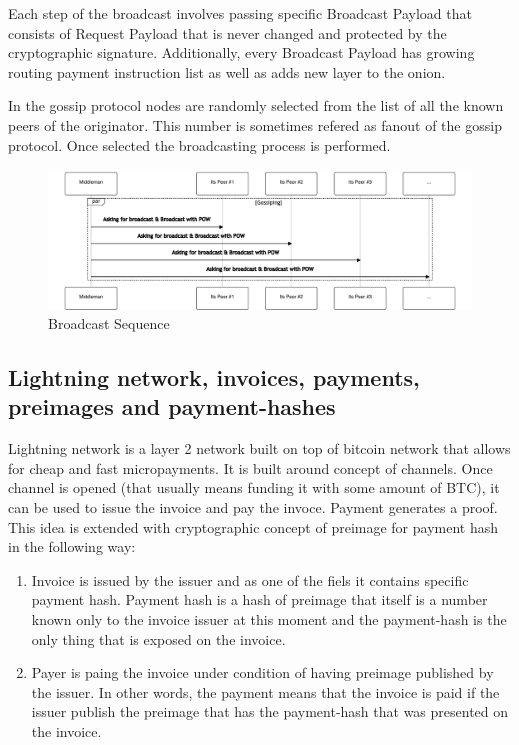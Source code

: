 \documentclass{article}
\begin{document}
Each step of the broadcast involves passing specific Broadcast Payload that consists of Request Payload that is never changed and protected by the cryptographic signature.  Additionally, every Broadcast Payload has growing routing payment instruction list as well as adds new layer to the onion.

In the gossip protocol nodes are randomly selected from the list of all the known peers of the originator. This number is sometimes refered as fanout \cite{Fanout} of the gossip protocol. Once selected the broadcasting process is performed.

\begin{figure}
	\centering
	\includegraphics[scale=0.5]{BroadcastSequence.pdf}
	\caption{Broadcast Sequence}
	\label{fig:fr:broadcastsequence}
\end{figure}

\subsection{Lightning network, invoices, payments, preimages and payment-hashes}

Lightning network is a layer 2 network built on top of bitcoin network that allows for cheap and fast micropayments.
It is built around concept of channels. Once channel is opened (that usually means funding it with some amount of BTC), it can be used to issue the invoice and pay the invoce. Payment generates a proof. This idea is extended with cryptographic concept of preimage for payment hash in the following way:
\begin{enumerate}
	\item Invoice is issued by the issuer and as one of the fiels it contains specific payment hash. Payment hash is a hash of preimage that itself is a number known only to the invoice issuer at this moment and the payment-hash is the only thing that is exposed on the invoice.
	\item Payer is paing the invoice under condition of having preimage published by the issuer. In other words, the payment means that the invoice is paid if the issuer publish the preimage that has the payment-hash that was presented on the invoice.
\end{enumerate}
\end{document}
